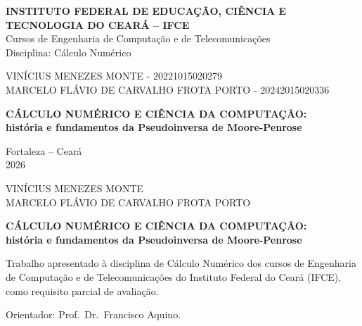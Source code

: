 \documentclass[12pt,a4paper,oneside]{report}
\begin{document}
\pagestyle{empty}

\thispagestyle{empty}
\begin{center}
  {\large\bfseries INSTITUTO FEDERAL DE EDUCAÇÃO, CIÊNCIA E TECNOLOGIA DO CEARÁ -- IFCE}\\[2pt]
  {\normalsize Cursos de Engenharia de Computação e de Telecomunicações}\\[2pt]
  {\normalsize Disciplina: Cálculo Numérico}

  \vspace{4.0cm}

  {\normalsize VINÍCIUS MENEZES MONTE - 20221015020279}\\[2pt]
  {\normalsize MARCELO FLÁVIO DE CARVALHO FROTA PORTO - 20242015020336}

  \vspace{3.5cm}

  {\large\bfseries CÁLCULO NUMÉRICO E CIÊNCIA DA COMPUTAÇÃO:}\\[4pt]
  {\large\bfseries história e fundamentos da Pseudoinversa de Moore-Penrose}

  \vfill

  {\normalsize Fortaleza -- Ceará\\ 2026}
\end{center}
\clearpage

\thispagestyle{empty}
\begin{center}
  {\normalsize VINÍCIUS MENEZES MONTE}\\[2pt]
  {\normalsize MARCELO FLÁVIO DE CARVALHO FROTA PORTO}

  \vspace{4.5cm}

  {\large\bfseries CÁLCULO NUMÉRICO E CIÊNCIA DA COMPUTAÇÃO:}\\[4pt]
  {\large\bfseries história e fundamentos da Pseudoinversa de Moore-Penrose}
\end{center}

\vspace{2.0cm}

\hfill\begin{minipage}{0.55\textwidth}
\singlespacing\small
Trabalho apresentado à disciplina de Cálculo Numérico dos cursos de Engenharia de
Computação e de Telecomunicações do Instituto Federal do Ceará (IFCE), como requisito
parcial de avaliação.

\vspace{0.8cm}
Orientador: Prof.\ Dr.\ Francisco Aquino.
\end{minipage}
\end{document}
